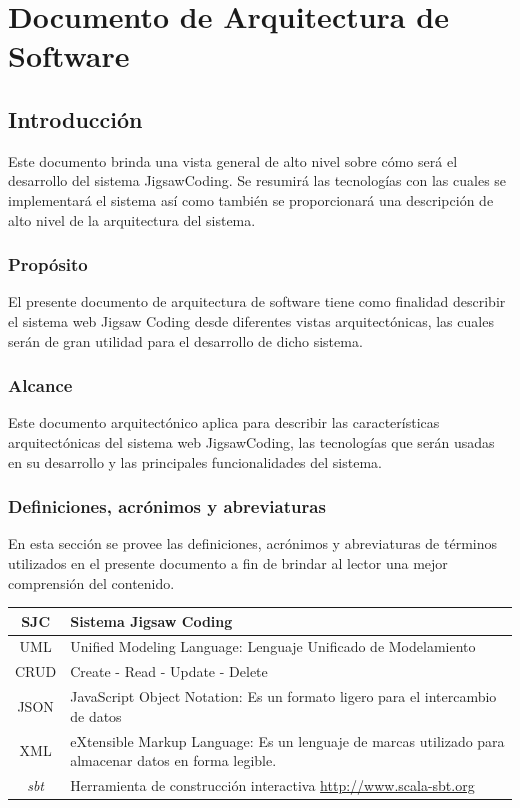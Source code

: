 \chapter{Documento de Arquitectura de Software}\label{apendice.C}
\section{Introducción}
Este documento brinda una vista general de alto nivel sobre cómo será el desarrollo del sistema JigsawCoding. Se resumirá las tecnologías con las cuales se implementará el sistema así como también se proporcionará una descripción de alto nivel de la arquitectura del sistema.
\subsection{Propósito}
El presente documento de arquitectura de software tiene como finalidad describir el sistema web Jigsaw Coding desde diferentes vistas arquitectónicas, las cuales serán de gran utilidad para el desarrollo de dicho sistema.
\subsection{Alcance} Este documento arquitectónico aplica para describir las características arquitectónicas del sistema web JigsawCoding, las tecnologías que serán usadas en su desarrollo y las principales funcionalidades del sistema.
\subsection{Definiciones, acrónimos y abreviaturas}
En esta sección se provee las definiciones, acrónimos y abreviaturas de términos utilizados en el presente documento a fin de brindar al lector una mejor comprensión del contenido. 
\clearpage
\begin{longtable}{|c|L{8cm}|}
    \hline
  SJC & Sistema Jigsaw Coding \\ \hline
  UML & Unified Modeling Language: Lenguaje Unificado de Modelamiento \\ \hline
  CRUD & Create - Read - Update - Delete \\ \hline
  JSON & JavaScript Object Notation: Es un formato ligero para el intercambio de datos \\ \hline
  XML & eXtensible Markup Language: Es un lenguaje de marcas utilizado para almacenar datos en forma legible. \\ \hline
  \emph{sbt} & Herramienta de construcción interactiva \url{http://www.scala-sbt.org} \\ \hline
\end{longtable}
